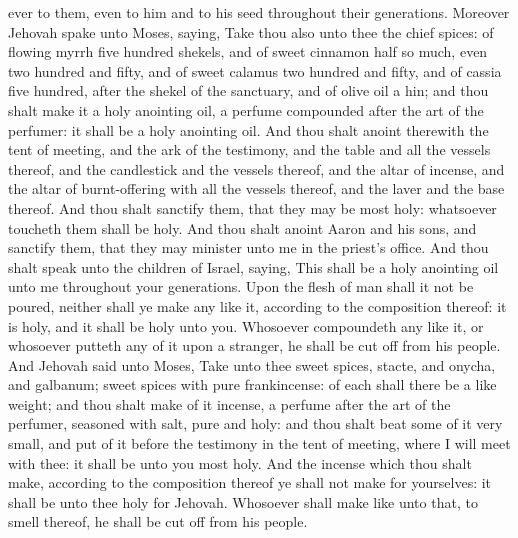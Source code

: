 ever to them, even to him and to his seed throughout their generations.  Moreover Jehovah spake unto Moses, saying, Take thou also unto thee the chief spices: of flowing myrrh five hundred shekels, and of sweet cinnamon half so much, even two hundred and fifty, and of sweet calamus two hundred and fifty, and of cassia five hundred, after the shekel of the sanctuary, and of olive oil a hin; and thou shalt make it a holy anointing oil, a perfume compounded after the art of the perfumer: it shall be a holy anointing oil. And thou shalt anoint therewith the tent of meeting, and the ark of the testimony, and the table and all the vessels thereof, and the candlestick and the vessels thereof, and the altar of incense, and the altar of burnt-offering with all the vessels thereof, and the laver and the base thereof. And thou shalt sanctify them, that they may be most holy: whatsoever toucheth them shall be holy. And thou shalt anoint Aaron and his sons, and sanctify them, that they may minister unto me in the priest’s office. And thou shalt speak unto the children of Israel, saying, This shall be a holy anointing oil unto me throughout your generations. Upon the flesh of man shall it not be poured, neither shall ye make any like it, according to the composition thereof: it is holy, and it shall be holy unto you. Whosoever compoundeth any like it, or whosoever putteth any of it upon a stranger, he shall be cut off from his people.  And Jehovah said unto Moses, Take unto thee sweet spices, stacte, and onycha, and galbanum; sweet spices with pure frankincense: of each shall there be a like weight; and thou shalt make of it incense, a perfume after the art of the perfumer, seasoned with salt, pure and holy: and thou shalt beat some of it very small, and put of it before the testimony in the tent of meeting, where I will meet with thee: it shall be unto you most holy. And the incense which thou shalt make, according to the composition thereof ye shall not make for yourselves: it shall be unto thee holy for Jehovah. Whosoever shall make like unto that, to smell thereof, he shall be cut off from his people. 

